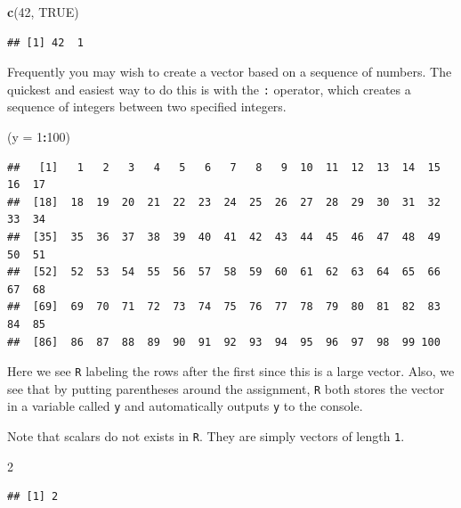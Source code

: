 \documentclass[]{book}
\newenvironment{Shaded}{\begin{snugshade}}{\end{snugshade}}
\newcommand{\KeywordTok}[1]{\textcolor[rgb]{0.13,0.29,0.53}{\textbf{#1}}}
\newcommand{\DataTypeTok}[1]{\textcolor[rgb]{0.13,0.29,0.53}{#1}}
\newcommand{\DecValTok}[1]{\textcolor[rgb]{0.00,0.00,0.81}{#1}}
\newcommand{\OtherTok}[1]{\textcolor[rgb]{0.56,0.35,0.01}{#1}}
\newcommand{\OperatorTok}[1]{\textcolor[rgb]{0.81,0.36,0.00}{\textbf{#1}}}
\newcommand{\NormalTok}[1]{#1}
\theoremstyle{definition}
\theoremstyle{definition}
\theoremstyle{definition}
\theoremstyle{remark}
\begin{document}
\begin{Shaded}
\begin{Highlighting}[]
\KeywordTok{c}\NormalTok{(}\DecValTok{42}\NormalTok{, }\OtherTok{TRUE}\NormalTok{)}
\end{Highlighting}
\end{Shaded}

\begin{verbatim}
## [1] 42  1
\end{verbatim}

Frequently you may wish to create a vector based on a sequence of
numbers. The quickest and easiest way to do this is with the \texttt{:}
operator, which creates a sequence of integers between two specified
integers.

\begin{Shaded}
\begin{Highlighting}[]
\NormalTok{(}\DataTypeTok{y =} \DecValTok{1}\OperatorTok{:}\DecValTok{100}\NormalTok{)}
\end{Highlighting}
\end{Shaded}

\begin{verbatim}
##   [1]   1   2   3   4   5   6   7   8   9  10  11  12  13  14  15  16  17
##  [18]  18  19  20  21  22  23  24  25  26  27  28  29  30  31  32  33  34
##  [35]  35  36  37  38  39  40  41  42  43  44  45  46  47  48  49  50  51
##  [52]  52  53  54  55  56  57  58  59  60  61  62  63  64  65  66  67  68
##  [69]  69  70  71  72  73  74  75  76  77  78  79  80  81  82  83  84  85
##  [86]  86  87  88  89  90  91  92  93  94  95  96  97  98  99 100
\end{verbatim}

Here we see \texttt{R} labeling the rows after the first since this is a
large vector. Also, we see that by putting parentheses around the
assignment, \texttt{R} both stores the vector in a variable called
\texttt{y} and automatically outputs \texttt{y} to the console.

Note that scalars do not exists in \texttt{R}. They are simply vectors
of length \texttt{1}.

\begin{Shaded}
\begin{Highlighting}[]
\DecValTok{2}
\end{Highlighting}
\end{Shaded}

\begin{verbatim}
## [1] 2
\end{verbatim}
\end{document}
